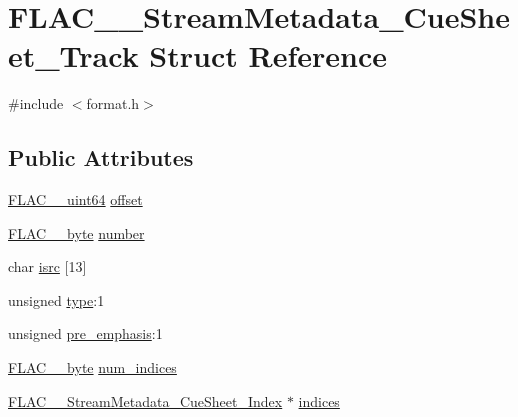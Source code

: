 \hypertarget{struct_f_l_a_c_____stream_metadata___cue_sheet___track}{}\section{F\+L\+A\+C\+\_\+\+\_\+\+Stream\+Metadata\+\_\+\+Cue\+Sheet\+\_\+\+Track Struct Reference}
\label{struct_f_l_a_c_____stream_metadata___cue_sheet___track}


{\ttfamily \#include $<$format.\+h$>$}

\subsection*{Public Attributes}
\begin{DoxyCompactItemize}
\item 
\mbox{\hyperlink{ordinals_8h_aa78c8c70a3eb8a58af7436f278acde8e}{F\+L\+A\+C\+\_\+\+\_\+uint64}} \mbox{\hyperlink{struct_f_l_a_c_____stream_metadata___cue_sheet___track_a40e1c888253a56b6dc4885a44138d1bf}{offset}}
\item 
\mbox{\hyperlink{ordinals_8h_a5eb569b12d5b047cdacada4d57924ee3}{F\+L\+A\+C\+\_\+\+\_\+byte}} \mbox{\hyperlink{struct_f_l_a_c_____stream_metadata___cue_sheet___track_a429103d63c44d1861b4dc0762726701a}{number}}
\item 
char \mbox{\hyperlink{struct_f_l_a_c_____stream_metadata___cue_sheet___track_a4990c8b13969f4c62683d915ebbf5744}{isrc}} \mbox{[}13\mbox{]}
\item 
unsigned \mbox{\hyperlink{struct_f_l_a_c_____stream_metadata___cue_sheet___track_a848575fc7a7292867ce76a9b3705f6e7}{type}}\+:1
\item 
unsigned \mbox{\hyperlink{struct_f_l_a_c_____stream_metadata___cue_sheet___track_ab4a97e43166ee16d1d16cccd901ddc3a}{pre\+\_\+emphasis}}\+:1
\item 
\mbox{\hyperlink{ordinals_8h_a5eb569b12d5b047cdacada4d57924ee3}{F\+L\+A\+C\+\_\+\+\_\+byte}} \mbox{\hyperlink{struct_f_l_a_c_____stream_metadata___cue_sheet___track_a5f1c1d7e3ddc533938b83951c7b3dda5}{num\+\_\+indices}}
\item 
\mbox{\hyperlink{struct_f_l_a_c_____stream_metadata___cue_sheet___index}{F\+L\+A\+C\+\_\+\+\_\+\+Stream\+Metadata\+\_\+\+Cue\+Sheet\+\_\+\+Index}} $\ast$ \mbox{\hyperlink{struct_f_l_a_c_____stream_metadata___cue_sheet___track_a14e0692a77b5b6689e208f48369edb90}{indices}}
\end{DoxyCompactItemize}


